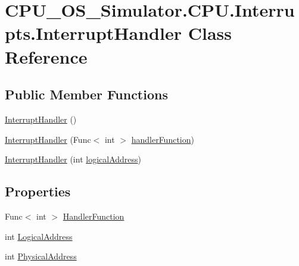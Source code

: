 \hypertarget{class_c_p_u___o_s___simulator_1_1_c_p_u_1_1_interrupts_1_1_interrupt_handler}{}\section{C\+P\+U\+\_\+\+O\+S\+\_\+\+Simulator.\+C\+P\+U.\+Interrupts.\+Interrupt\+Handler Class Reference}
\label{class_c_p_u___o_s___simulator_1_1_c_p_u_1_1_interrupts_1_1_interrupt_handler}
\subsection*{Public Member Functions}
\begin{DoxyCompactItemize}
\item 
\hyperlink{class_c_p_u___o_s___simulator_1_1_c_p_u_1_1_interrupts_1_1_interrupt_handler_aa9506f2c9e948beed61550025c94fc4b}{Interrupt\+Handler} ()
\item 
\hyperlink{class_c_p_u___o_s___simulator_1_1_c_p_u_1_1_interrupts_1_1_interrupt_handler_aef34b6398f0d7a8391fc94187f7f6836}{Interrupt\+Handler} (Func$<$ int $>$ \hyperlink{class_c_p_u___o_s___simulator_1_1_c_p_u_1_1_interrupts_1_1_interrupt_handler_ab5f8f27abc20f4db2db2ea3a82ff2517}{handler\+Function})
\item 
\hyperlink{class_c_p_u___o_s___simulator_1_1_c_p_u_1_1_interrupts_1_1_interrupt_handler_a3b8283eecf1080567f11ac6c9327fac4}{Interrupt\+Handler} (int \hyperlink{class_c_p_u___o_s___simulator_1_1_c_p_u_1_1_interrupts_1_1_interrupt_handler_a3f7114cd6e6b4e4bd6472118e8aef2fe}{logical\+Address})
\end{DoxyCompactItemize}
\subsection*{Properties}
\begin{DoxyCompactItemize}
\item 
Func$<$ int $>$ \hyperlink{class_c_p_u___o_s___simulator_1_1_c_p_u_1_1_interrupts_1_1_interrupt_handler_aac704c8efffc132acabd9862ed7cff3f}{Handler\+Function}
\item 
int \hyperlink{class_c_p_u___o_s___simulator_1_1_c_p_u_1_1_interrupts_1_1_interrupt_handler_a4eb5f999c92ce0e432f8d997e4d7b32f}{Logical\+Address}
\item 
int \hyperlink{class_c_p_u___o_s___simulator_1_1_c_p_u_1_1_interrupts_1_1_interrupt_handler_a5e291375ce7055c170c2f0fe309f4bb5}{Physical\+Address}
\end{DoxyCompactItemize}
